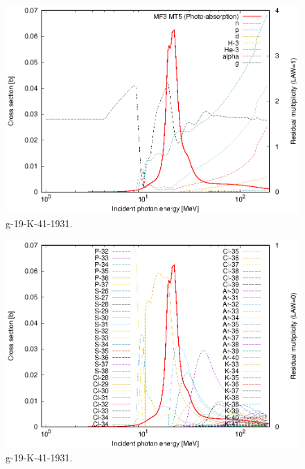 \begin{figure}
 \includegraphics[width=\linewidth]{eps/g_19-K-41_1931.eps}
  \caption{g-19-K-41-1931.}
\end{figure}
\begin{figure}
 \includegraphics[width=\linewidth]{eps-law0/g_19-K-41_1931.eps}
 \caption{g-19-K-41-1931.}
\end{figure}
\newpage \clearpage

